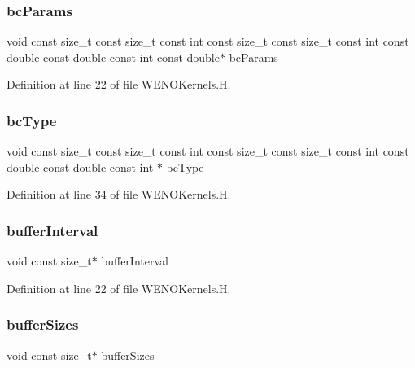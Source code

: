 \subsubsection{\texorpdfstring{bc\+Params}{bcParams}}
{\footnotesize\ttfamily void const size\+\_\+t const size\+\_\+t const int const size\+\_\+t const size\+\_\+t const int const double const double const int const double$\ast$ bc\+Params}



Definition at line 22 of file W\+E\+N\+O\+Kernels.\+H.

\hypertarget{WENOKernels_8H_a487076dc9e8353b4914f8aba0e71ad93}{}\label{WENOKernels_8H_a487076dc9e8353b4914f8aba0e71ad93} 
\subsubsection{\texorpdfstring{bc\+Type}{bcType}}
{\footnotesize\ttfamily void const size\+\_\+t const size\+\_\+t const int const size\+\_\+t const size\+\_\+t const int const double const double const int $\ast$ bc\+Type}



Definition at line 34 of file W\+E\+N\+O\+Kernels.\+H.

\hypertarget{WENOKernels_8H_ad1001168d5432b52e6d0636f4dc0e60c}{}\label{WENOKernels_8H_ad1001168d5432b52e6d0636f4dc0e60c} 
\subsubsection{\texorpdfstring{buffer\+Interval}{bufferInterval}}
{\footnotesize\ttfamily void const size\+\_\+t$\ast$ buffer\+Interval}



Definition at line 22 of file W\+E\+N\+O\+Kernels.\+H.

\hypertarget{WENOKernels_8H_a302023d425dc22c2c647b4f9d8c78b0b}{}\label{WENOKernels_8H_a302023d425dc22c2c647b4f9d8c78b0b} 
\subsubsection{\texorpdfstring{buffer\+Sizes}{bufferSizes}}
{\footnotesize\ttfamily void const size\+\_\+t$\ast$ buffer\+Sizes}



